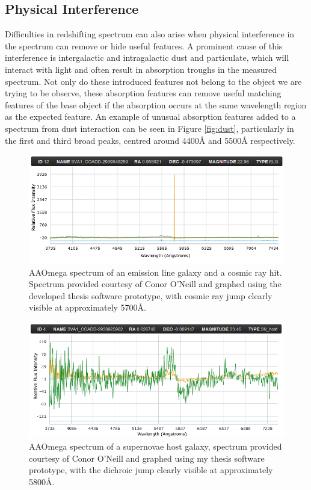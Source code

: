 \documentclass[titlesmallcaps, examinerscopy, copyrightpage]{uqthesis}
\begin{document}
\subsection{Physical Interference}

Difficulties in redshifting spectrum can also arise when physical interference in the spectrum can remove or hide useful features. A prominent cause of this interference is intergalactic and intragalactic dust and particulate, which will interact with light and often result in absorption troughs in the measured spectrum. Not only do these introduced features not belong to the object we are trying to be observe, these absorption features can remove useful matching features of the base object if the absorption occurs at the same wavelength region as the expected feature. An example of unusual absorption features added to a spectrum from dust interaction can be seen in Figure \ref{fig:dust}, particularly in the first and third broad peaks, centred around 4400{\AA} and 5500{\AA} respectively.




\begin{figure}[ht!]
\includegraphics[width=1\textwidth]{images/CosmicRay.PNG} 
\centering
\caption{AAOmega spectrum of an emission line galaxy and a cosmic ray hit. Spectrum provided courtesy of Conor O'Neill and graphed using the developed thesis software prototype, with cosmic ray jump clearly visible at approximately 5700{\AA}.}
\label{fig:cosmic}
\end{figure}

\begin{figure}[ht!]
\includegraphics[width=1\textwidth]{images/jump.PNG} 
\centering
\caption{AAOmega spectrum of a supernovae host galaxy, spectrum provided courtesy of Conor O'Neill and graphed using my thesis software prototype, with the dichroic jump clearly visible at approximately 5800{\AA}.}
\label{fig:jump}
\end{figure}
\end{document}
